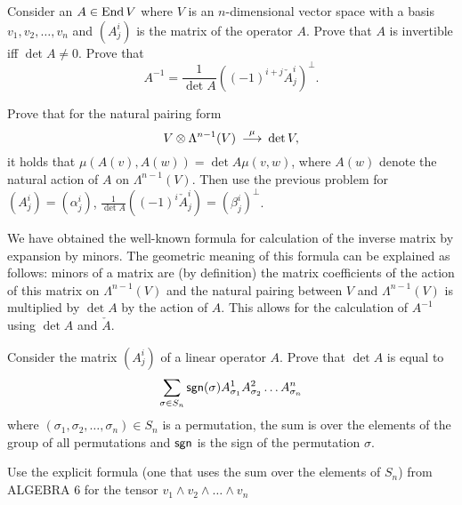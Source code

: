 \documentclass[12pt]{article}
\begin{document}
\begin{zadacha}[!]
Consider an $A\in \operatorname{End} V$ where $V$ is an $n$-dimensional vector space
with a basis $v_1, v_2, \dots, v_n$ and $(A^i_j)$ is the matrix of the
operator $A$. Prove that $A$ is invertible iff $\det A\neq 0$. 
Prove that
\[
A^{-1} = \frac 1{\det A} ((-1)^{i+j}\check A^i_j)^\bot.
\]
\end{zadacha}

\begin{ukazanie}
Prove that for the natural pairing form
\[ 
V \otimes \Lambda^{n-1}(V) \stackrel \mu {{\:\longrightarrow\:}} \det V,
\]
it holds that $\mu(A(v), A(w)) = \det A \mu(v, w)$, where $A(w)$
denote the natural action of $A$ on $\Lambda^{n-1}(V)$. Then use the
previous problem for $(A^i_j)=(\alpha^i_j)$, $\frac 1{\det A}
((-1)^i\check A^i_j) = (\beta^i_j)^\bot$.
\end{ukazanie}

\begin{zamechanie}
  We have obtained the well-known formula for calculation of the
  inverse matrix by expansion by minors.  The geometric meaning of
  this formula can be explained as follows: minors of a matrix are (by
  definition) the matrix coefficients of the action of this matrix on
  $\Lambda^{n-1}(V)$ and the natural pairing between $V$ and
  $\Lambda^{n-1}(V)$ is multiplied by $\det A$ by the action of
  $A$. This allows for the calculation of $A^{-1}$ using $\det A$ and
  $\check A$.
\end{zamechanie}


\begin{zadacha}[!]
Consider the matrix $(A^i_j)$  of a linear operator $A$.
Prove that $\det A$ is equal to 
\[
\sum_{\sigma\in S_n}\operatorname{\sf sgn}(\sigma) A^1_{\sigma_1} 
A^2_{\sigma_2} \dots A^n_{\sigma_n}
\]
where $(\sigma_1, \sigma_2, \dots, \sigma_n)\in S_n$ is a permutation,
the sum is over the elements of the group of all permutations and
$\operatorname{\sf sgn}$ is the sign of the permutation $\sigma$. 
\end{zadacha}

\begin{ukazanie}
Use the explicit formula (one that uses the sum over the elements of
$S_n$) from ALGEBRA 6 for the tensor  
$v_1\wedge v_2 \wedge \dots \wedge v_n$

\end{ukazanie}
\end{document}
